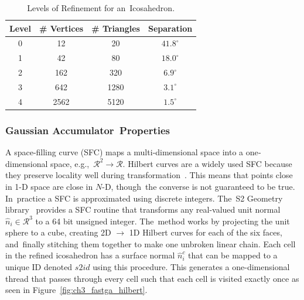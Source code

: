 \begin{table}[H]
\centering
\caption{Levels of Refinement for an~Icosahedron.}\label{table:fastga_refinement}
\begin{tabular}{@{}cccc@{}}
\toprule
\textbf{Level} & \textbf{\# Vertices} & \textbf{\# Triangles }& \textbf{Separation} \\ \midrule
0     & 12          & 20           & $41.8^{\circ}$          \\
1     & 42          & 80           & $18.0^{\circ}$            \\
2     & 162         & 320          & $6.9^{\circ}$              \\
3     & 642         & 1280         & $3.1^{\circ}$              \\
4     & 2562        & 5120         & $1.5^{\circ}$              \\ \bottomrule
\end{tabular}
\end{table}
\unskip



\subsubsection{Gaussian Accumulator~Properties}\label{sec:ch3_methods_fastga_ga}

A space-filling curve (SFC) maps a multi‐dimensional space into a one‐dimensional space, e.g.,~$\mathcal{R}^2 \rightarrow \mathcal{R}$.  Hilbert curves are a widely used SFC because they preserve locality well during transformation~\cite{mokbel_space-filling_2008}. This means that points close in 1-D space are close in $N$-D, though~the converse is not guaranteed to be true. In~practice a SFC is approximated using discrete integers. The~S2 Geometry library~\cite{google_s2_2020} provides a SFC routine that transforms any real-valued unit normal $\hat{n}_i \in \mathcal{R}^3$ to a 64 bit unsigned integer. The~method works by projecting the unit sphere to a cube, creating 2D $\rightarrow$ 1D Hilbert curves for each of the six faces, and~finally stitching them together to make one unbroken linear chain.  Each cell in the refined icosahedron has a surface normal $\hat{n}^{c}_{i}$ that can be mapped to a unique ID denoted $s2id$ using this procedure. This generates a one-dimensional thread that passes through every cell such that each cell is visited exactly once as seen in Figure~\ref{fig:ch3_fastga_hilbert}.

